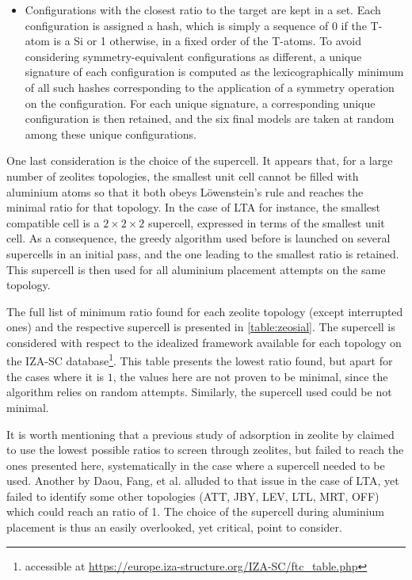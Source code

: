\documentclass[main.tex]{subfiles}
\begin{document}
\begin{itemize}
    \item Configurations with the closest \SiAl ratio to the target are kept in a set. Each configuration is assigned a hash, which is simply a sequence of 0 if the T-atom is a Si or 1 otherwise, in a fixed order of the T-atoms. To avoid considering symmetry-equivalent configurations as different, a unique signature of each configuration is computed as the lexicographically minimum of all such hashes corresponding to the application of a symmetry operation on the configuration. For each unique signature, a corresponding unique configuration is then retained, and the six final models are taken at random among these unique configurations.
\end{itemize}\label{aluminiumhash}

One last consideration is the choice of the supercell. It appears that, for a large number of zeolites topologies, the smallest unit cell cannot be filled with aluminium atoms so that it both obeys L\"owenstein's rule and reaches the minimal \SiAl ratio for that topology. In the case of LTA for instance, the smallest compatible cell is a $2\times2\times2$ supercell, expressed in terms of the smallest unit cell. As a consequence, the greedy algorithm used before is launched on several supercells in an initial pass, and the one leading to the smallest \SiAl ratio is retained. This supercell is then used for all aluminium placement attempts on the same topology.

The full list of minimum \SiAl ratio found for each zeolite topology (except interrupted ones) and the respective supercell is presented in \cref{table:zeosial}. The supercell is considered with respect to the idealized framework available for each topology on the IZA-SC database\footnote{accessible at \url{https://europe.iza-structure.org/IZA-SC/ftc_table.php}}. This table presents the lowest \SiAl ratio found, but apart for the cases where it is $1$, the values here are not proven to be minimal, since the algorithm relies on random attempts. Similarly, the supercell used could be not minimal.

It is worth mentioning that a previous study of adsorption in zeolite by \textcite{WrongLowestSiAl1} claimed to use the lowest possible \SiAl ratios to screen through zeolites, but failed to reach the ones presented here, systematically in the case where a supercell needed to be used. Another by Daou, Fang, et al. \cite{WrongLowestSiAl2,WrongLowestSiAl3} alluded to that issue in the case of LTA, yet failed to identify some other topologies (ATT, JBY, LEV, LTL, MRT, OFF) which could reach an \SiAl ratio of 1. The choice of the supercell during aluminium placement is thus an easily overlooked, yet critical, point to consider.
\end{document}
